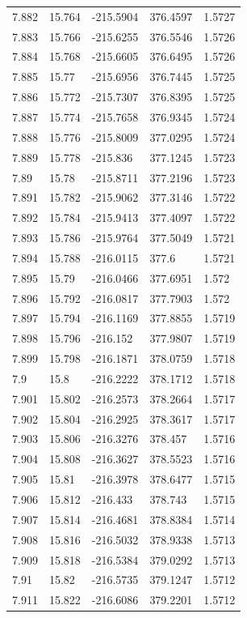 \begin{tabular}{lllll}
7.882 & 15.764 & -215.5904 & 376.4597 & 1.5727 \\
7.883 & 15.766 & -215.6255 & 376.5546 & 1.5726 \\
7.884 & 15.768 & -215.6605 & 376.6495 & 1.5726 \\
7.885 & 15.77 & -215.6956 & 376.7445 & 1.5725 \\
7.886 & 15.772 & -215.7307 & 376.8395 & 1.5725 \\
7.887 & 15.774 & -215.7658 & 376.9345 & 1.5724 \\
7.888 & 15.776 & -215.8009 & 377.0295 & 1.5724 \\
7.889 & 15.778 & -215.836 & 377.1245 & 1.5723 \\
7.89 & 15.78 & -215.8711 & 377.2196 & 1.5723 \\
7.891 & 15.782 & -215.9062 & 377.3146 & 1.5722 \\
7.892 & 15.784 & -215.9413 & 377.4097 & 1.5722 \\
7.893 & 15.786 & -215.9764 & 377.5049 & 1.5721 \\
7.894 & 15.788 & -216.0115 & 377.6 & 1.5721 \\
7.895 & 15.79 & -216.0466 & 377.6951 & 1.572 \\
7.896 & 15.792 & -216.0817 & 377.7903 & 1.572 \\
7.897 & 15.794 & -216.1169 & 377.8855 & 1.5719 \\
7.898 & 15.796 & -216.152 & 377.9807 & 1.5719 \\
7.899 & 15.798 & -216.1871 & 378.0759 & 1.5718 \\
7.9 & 15.8 & -216.2222 & 378.1712 & 1.5718 \\
7.901 & 15.802 & -216.2573 & 378.2664 & 1.5717 \\
7.902 & 15.804 & -216.2925 & 378.3617 & 1.5717 \\
7.903 & 15.806 & -216.3276 & 378.457 & 1.5716 \\
7.904 & 15.808 & -216.3627 & 378.5523 & 1.5716 \\
7.905 & 15.81 & -216.3978 & 378.6477 & 1.5715 \\
7.906 & 15.812 & -216.433 & 378.743 & 1.5715 \\
7.907 & 15.814 & -216.4681 & 378.8384 & 1.5714 \\
7.908 & 15.816 & -216.5032 & 378.9338 & 1.5713 \\
7.909 & 15.818 & -216.5384 & 379.0292 & 1.5713 \\
7.91 & 15.82 & -216.5735 & 379.1247 & 1.5712 \\
7.911 & 15.822 & -216.6086 & 379.2201 & 1.5712 \\

\end{tabular}
